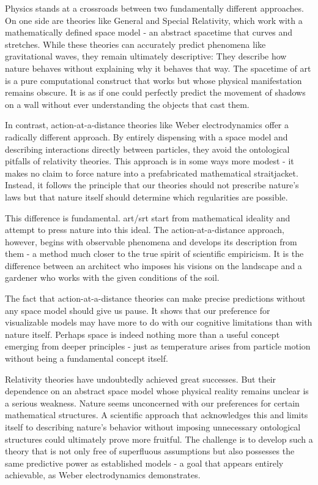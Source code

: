 Physics stands at a crossroads between two fundamentally different approaches. On one side are theories like General and Special Relativity, which work with a
mathematically defined space model - an abstract spacetime that curves and stretches. While these theories can accurately predict phenomena like gravitational waves,
they remain ultimately descriptive: They describe how nature behaves without explaining why it behaves that way. The spacetime of \gls{art} is a pure computational construct that
works but whose physical manifestation remains obscure. It is as if one could perfectly predict the movement of shadows on a wall without ever understanding the objects
that cast them.

In contrast, action-at-a-distance theories like Weber electrodynamics offer a radically different approach. By entirely dispensing with a space model and describing interactions directly between particles,
they avoid the ontological pitfalls of relativity theories. This approach is in some ways more modest - it makes no claim to force nature into a
prefabricated mathematical straitjacket. Instead, it follows the principle that our theories should not prescribe nature's laws but that nature itself should determine
which regularities are possible.

This difference is fundamental. \gls{art}/\gls{srt} start from mathematical ideality and attempt to press nature into this ideal. The action-at-a-distance approach, however,
begins with observable phenomena and develops its description from them - a method much closer to the true spirit of scientific empiricism. It is the difference
between an architect who imposes his visions on the landscape and a gardener who works with the given conditions of the soil.

The fact that action-at-a-distance theories can make precise predictions without any space model should give us pause. It shows that our preference for visualizable
models may have more to do with our cognitive limitations than with nature itself. Perhaps space is indeed nothing more than a useful concept emerging from
deeper principles - just as temperature arises from particle motion without being a fundamental concept itself.

Relativity theories have undoubtedly achieved great successes. But their dependence on an abstract space model whose physical reality remains unclear is a
serious weakness. Nature seems unconcerned with our preferences for certain mathematical structures. A scientific approach that acknowledges this and limits itself
to describing nature's behavior without imposing unnecessary ontological structures could ultimately prove more fruitful. The challenge is to develop such a
theory that is not only free of superfluous assumptions but also possesses the same predictive power as established models - a goal that appears entirely achievable,
as Weber electrodynamics demonstrates.
